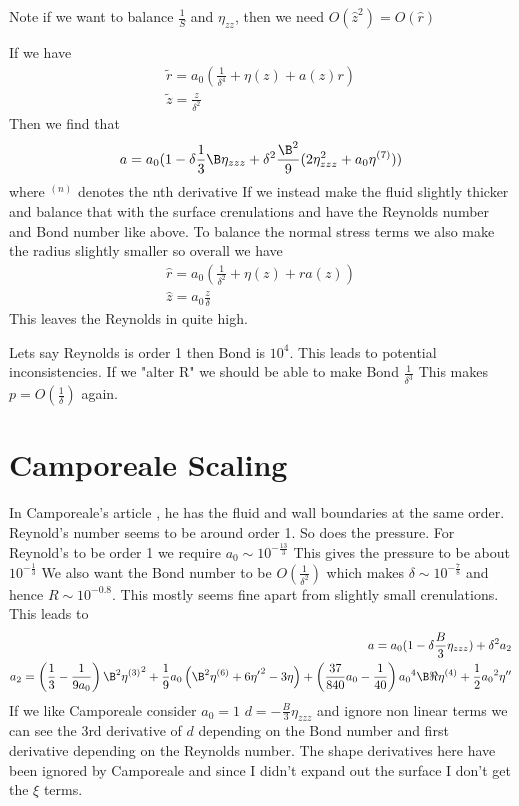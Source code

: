 \documentclass[12pt]{article}
\begin{document}
Note if we want to balance $\frac{1}{S}$ and $\eta_{zz}$, then we need $O(\hat z^2) = O(\hat r)$

If we have 
\begin{align} 
\tilde{r} = a_0\left(\frac{1}{\delta^4}+\eta(z) +a(z)r\right)\\
\tilde{z} = \frac{z}{\delta^2}
\end{align}
Then we find that 
\begin{align}
a = a_0(1- \delta\frac{1}{3}\B\eta_{zzz}+ \delta^2\frac{\B^2}{9}(2\eta_{zzz}^2+a_0\eta^{(7)}))
\end{align}
where $^{(n)}$ denotes the nth derivative
If we instead make the fluid slightly thicker and balance that with the surface crenulations and have the Reynolds number and Bond number like above. To balance the normal stress terms we also make the radius slightly smaller so overall we have
\begin{align}
\hat r = a_0\left(\frac{1}{\delta^2}+\eta(z)+ ra(z)\right) \\
\hat z = a_0 \frac{z}{\delta}
\end{align}
This leaves the Reynolds in quite high.

Lets say Reynolds is order 1 then Bond is $10^4$. This leads to potential inconsistencies. If we "alter R" we should be able to make Bond $\frac{1}{\delta^3}$ This makes $p = O(\frac{1}{\delta})$ again.
\section{Camporeale Scaling}

In Camporeale's article \cite{camporeale_2017}, he has the fluid and wall boundaries at the same order. Reynold's number seems to be around order 1. So does the pressure. For Reynold's to be order 1 we require $a_0 \sim 10^{-\frac{13}{3}}$ This gives the pressure to be about $10^{-\frac{1}{3}}$ We also want the Bond number to be $O(\frac{1}{\delta^2}) $ which makes $\delta\sim10^{-\frac{7}{8}}$ and hence $R\sim 10^{-0.8}$. This mostly seems fine apart from slightly small crenulations.
	This leads to \begin{align}
	a = a_0(1 - \delta\frac{B}{3}\eta_{zzz})+\delta^2 a_2\\
	a_2 = \left(\frac{1}{3}-\frac{1}{9 a_0}\right)\B^2 {\eta ^{(3)}}^2+\frac{1}{9} a_0 \left(\B^2 \eta^{(6)}+6 {\eta '}^2-3 \eta \right)+\left(\frac{37}{840} {a_0}-\frac{1}{40}\right) {a_0}^4 \B \Re \eta ^{(4)}+\frac{1}{2} {a_0}^2 \eta
	''
	\end{align}
	If we like Camporeale consider $a_0 =1$ $d=-\frac{B}{3}\eta_{zzz}$ and ignore non linear terms we can see the 3rd derivative of $d$ depending on the Bond number and first derivative depending on the Reynolds number. The shape derivatives here have been ignored by Camporeale and since I didn't expand out the surface I don't get the $\xi$ terms.
\end{document}
